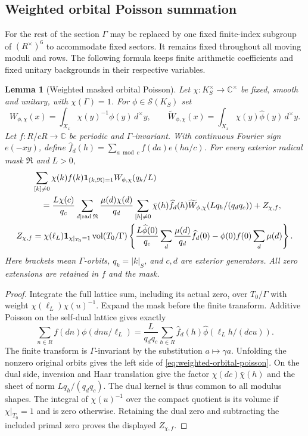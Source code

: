 \documentclass[11pt,a4paper]{article}
\numberwithin{equation}{section}
\newtheorem{lemma}[theorem]{Lemma}
\theoremstyle{definition}
\theoremstyle{remark}
\begin{document}
\subsection{Weighted orbital Poisson summation}

For the rest of the section $\Gamma$ may be replaced by one fixed
finite-index subgroup of $(R^\times)^6$ to accommodate fixed sectors.
It remains fixed throughout all moving moduli and rows.
The following formula keeps finite arithmetic coefficients and fixed
unitary backgrounds in their respective variables.

\begin{lemma}[Weighted masked orbital Poisson]\label{lem:weighted-orbital-poisson}
Let $\chi:K_S^\times\to\mathbb C^\times$ be fixed, smooth and unitary,
with $\chi(\Gamma)=1$.  For $\phi\in\mathcal S(K_S)$ set
\[
 W_{\phi,\chi}(x)=\int_{X_x}\chi(y)^{-1}\phi(y)\,d^\times y,
 \qquad
 \widetilde W_{\phi,\chi}(x)=\int_{X_x}\chi(y)\widehat\phi(y)\,d^\times y.
\]
Let $f:R/cR\to\mathbb C$ be periodic and $\Gamma$-invariant.  With
continuous Fourier sign $e(-xy)$, define
$\widehat f_d(h)=\sum_{a\bmod c}f(da)e(ha/c)$.
For every exterior radical mask $\mathfrak R$ and $L>0$,
\begin{align}\label{eq:weighted-orbital-poisson}
 &\sum_{[k]\ne0}\chi(k)f(k)\mathbf1_{(k,\mathfrak R)=1}
       W_{\phi,\chi}(q_k/L)\notag\\
 &\quad=\frac{L\chi(c)}{q_c}
       \sum_{d\mid\operatorname{rad}\mathfrak R}\frac{\mu(d)\chi(d)}{q_d}
       \sum_{[h]\ne0}\bar\chi(h)\widehat f_d(h)
       \widetilde W_{\phi,\chi}(Lq_h/(q_dq_c))+Z_{\chi,f},\\
 Z_{\chi,f}
 &=\chi(\ell_L)\mathbf1_{\chi|_{T_0}=1}\operatorname{vol}(T_0/\Gamma)
 \left\{\frac{L\widehat\phi(0)}{q_c}
       \sum_d\frac{\mu(d)}{q_d}\widehat f_d(0)
       -\phi(0)f(0)\sum_d\mu(d)\right\}.\notag
\end{align}
Here brackets mean $\Gamma$-orbits, $q_k=|k|_S$, and $c,d$ are exterior
generators.  All zero extensions are retained in $f$ and the mask.
\end{lemma}
\begin{proof}
Integrate the full lattice sum, including its actual zero, over
$T_0/\Gamma$ with weight $\chi(\ell_L)\chi(u)^{-1}$.
Expand the mask before the finite transform.  Additive Poisson on the
self-dual lattice gives exactly
\[
 \sum_{n\in R}f(dn)\phi(dnu/\ell_L)
  =\frac{L}{q_dq_c}\sum_{h\in R}\widehat f_d(h)
                    \widehat\phi(\ell_Lh/(dcu)).
\]
The finite transform is $\Gamma$-invariant by the substitution
$a\mapsto\gamma a$.  Unfolding the nonzero original orbits gives the
left side of \eqref{eq:weighted-orbital-poisson}.  On the dual side,
inversion and Haar translation give the factor $\chi(dc)\bar\chi(h)$
and the sheet of norm $Lq_h/(q_dq_c)$.  The dual kernel is thus common to all modulus shapes.  The integral of
$\chi(u)^{-1}$ over the compact quotient is its volume if
$\chi|_{T_0}=1$ and is zero otherwise.  Retaining the dual zero and
subtracting the included primal zero proves the displayed $Z_{\chi,f}$.

\end{proof}
\end{document}
